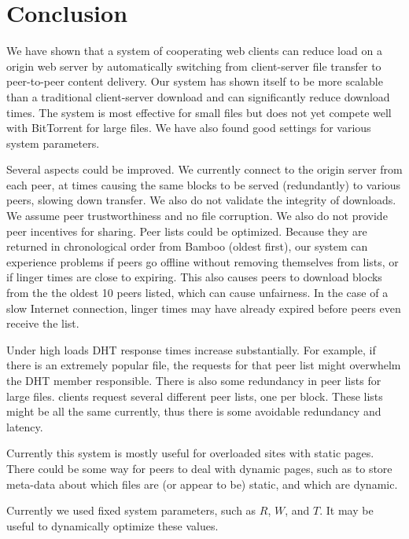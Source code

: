 \chapter{Conclusion}

We have shown that a system of cooperating web clients can reduce load on a origin web server by automatically switching
from client-server file transfer to peer-to-peer content delivery. Our system has shown itself to be more scalable 
than a traditional client-server download and can significantly
reduce download times.  The system is most effective for small files but does not yet compete well with
BitTorrent for large files.  We have also found good settings for various system parameters.

Several aspects could be improved.  We currently connect to the origin
server from each peer, at times causing the same blocks to be served (redundantly) to various peers, slowing down transfer.
We also do not validate the integrity of downloads.  We assume peer trustworthiness and no file corruption.  We also do not provide peer incentives for sharing.
Peer lists could be optimized.  Because they are returned in chronological order from Bamboo (oldest first), our system can experience problems if peers
go offline without removing themselves from lists, or if linger times are close to expiring.  This also causes peers to download blocks 
from the the oldest 10 peers listed, which can cause unfairness. In the case of a slow Internet connection, linger times may have
already expired before peers even receive the list.

Under high loads DHT response times increase substantially.  For example, if there is an extremely popular file, the 
requests for that peer list might overwhelm the DHT member responsible.  There is also some redundancy in peer lists for large files.  
clients request several different peer lists, one per block.  These lists might be all the same currently, thus
there is some avoidable redundancy and latency.

Currently this system is mostly useful for overloaded sites with static pages.  There could be some way for peers to deal with dynamic pages, such as to
store meta-data about which files are (or appear to be) static, and which are dynamic.  

Currently we used fixed system parameters, such as $R$, $W$, and $T$.  It may be useful to dynamically optimize these values.